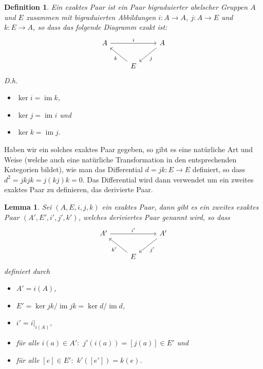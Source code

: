 \documentclass[12pt, hidelinks]{article}
\numberwithin{conj}{section}
\newtheorem{definition}[conj]{Definition}
\newtheorem{lemma}[conj]{Lemma}
\newcommand{\ima}{\operatorname{im}}
\begin{document}
\begin{definition}
    Ein exaktes Paar ist ein Paar bigraduierter abelscher Gruppen $A$ und $E$ zusammen mit bigraduierten Abbildungen $i: A \to A$, $j: A \to E$ und $k: E \to A$, so dass das folgende Diagramm exakt ist:
    \[\begin{tikzcd}
    	A && A \\
    	& E
    	\arrow["i", from=1-1, to=1-3]
    	\arrow["j", from=1-3, to=2-2]
    	\arrow["k", from=2-2, to=1-1]
    \end{tikzcd}\]
    D.h.
    \begin{itemize}[nolistsep]
        \item $\ker i = \ima k$,
        \item $\ker j = \ima i$ und
        \item $\ker k = \ima j$.
    \end{itemize}
\end{definition}

Haben wir ein solches exaktes Paar gegeben, so gibt es eine natürliche Art und Weise (welche auch eine natürliche Transformation in den entsprechenden Kategorien bildet), wie man das Differential $d = jk: E \to E$ definiert, so dass $d^2 = jkjk = j(kj)k = 0$. Das Differential wird dann verwendet um ein zweites exaktes Paar zu definieren, das derivierte Paar.

\begin{lemma}
    Sei $(A,E,i,j,k)$ ein exaktes Paar, dann gibt es ein zweites exaktes Paar $(A',E',i',j',k')$, welches deriviertes Paar genannt wird, so dass
    \[\begin{tikzcd}
    	A' && A' \\
    	& E
    	\arrow["i'", from=1-1, to=1-3]
    	\arrow["j'", from=1-3, to=2-2]
    	\arrow["k'", from=2-2, to=1-1]
    \end{tikzcd}\]
    definiert durch
    \begin{itemize}[nolistsep]
        \item $A' = i(A)$,
        \item $E' = \ker jk / \ima jk = \ker d / \ima d$,
        \item $i' = i\vert_{i(A)}$,
        \item für alle $i(a) \in A':$ $j'(i(a)) = [j(a)] \in E'$ und
        \item für alle $[e] \in E':$ $k'([e']) = k(e)$.
    \end{itemize}
\end{lemma}
\end{document}
